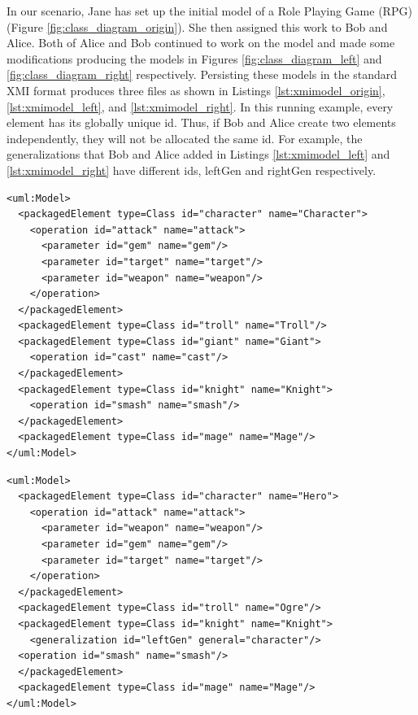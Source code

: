 In our scenario, Jane has set up the initial model of a Role Playing Game (RPG) (Figure \ref{fig:class_diagram_origin}). She then assigned this work to Bob and Alice. Both of Alice and Bob continued to work on the model and made some modifications producing the models in Figures \ref{fig:class_diagram_left} and \ref{fig:class_diagram_right} respectively. Persisting these models in the standard XMI \cite{omg2018xmi} format produces three files as shown in Listings \ref{lst:xmimodel_origin}, \ref{lst:xmimodel_left}, and \ref{lst:xmimodel_right}. In this running example, every element has its globally unique id. Thus, if Bob and Alice create two elements independently, they will not be allocated the same id. For example, the generalizations that Bob and Alice added in Listings \ref{lst:xmimodel_left} and \ref{lst:xmimodel_right} have different ids, \textsf{leftGen} and \textsf{rightGen} respectively.  

\vspace{-20pt}
\begin{lstlisting}[style=xmi,caption={Simplified XMI file of the original version in Figure \ref{fig:class_diagram_origin}.},label=lst:xmimodel_origin]
<uml:Model>
  <packagedElement type=Class id="character" name="Character">
    <operation id="attack" name="attack">
      <parameter id="gem" name="gem"/>
      <parameter id="target" name="target"/>
      <parameter id="weapon" name="weapon"/>
    </operation>
  </packagedElement>
  <packagedElement type=Class id="troll" name="Troll"/>
  <packagedElement type=Class id="giant" name="Giant">
    <operation id="cast" name="cast"/>
  </packagedElement>
  <packagedElement type=Class id="knight" name="Knight">
    <operation id="smash" name="smash"/>
  </packagedElement>
  <packagedElement type=Class id="mage" name="Mage"/>
</uml:Model>
\end{lstlisting}

\vspace{-20pt}
\begin{lstlisting}[style=xmi,caption={Simplified XMI file of the left version in Figure \ref{fig:class_diagram_left}.},label=lst:xmimodel_left]
<uml:Model>
  <packagedElement type=Class id="character" name="Hero">
    <operation id="attack" name="attack">
      <parameter id="weapon" name="weapon"/>
      <parameter id="gem" name="gem"/>
      <parameter id="target" name="target"/>
    </operation>  
  </packagedElement>
  <packagedElement type=Class id="troll" name="Ogre"/>
  <packagedElement type=Class id="knight" name="Knight">
    <generalization id="leftGen" general="character"/>
  <operation id="smash" name="smash"/>
  </packagedElement>
  <packagedElement type=Class id="mage" name="Mage"/>
</uml:Model>
\end{lstlisting}

